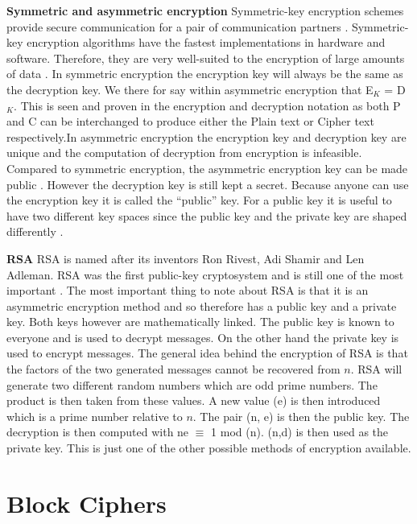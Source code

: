 \documentclass[11pt,a4paper]{report}
\begin{document}
\textbf{Symmetric and asymmetric encryption}
Symmetric-key encryption schemes provide secure communication for a pair of communication partners \cite{DBLP:series/isc/DelfsK07}. Symmetric-key encryption algorithms have the fastest implementations in hardware and software. Therefore, they are very well-suited to the encryption of large amounts of data \cite{DBLP:series/isc/DelfsK07}. In symmetric encryption the encryption key will always be the same as the decryption key. We there for say within asymmetric encryption that E$_{K}$ = D$_{K}$. This is seen and proven in the encryption and decryption notation as both P and C can be interchanged to produce either the Plain text or Cipher text respectively.In asymmetric encryption the encryption key and decryption key are unique and the computation of decryption from encryption is infeasible. Compared to symmetric encryption, the asymmetric encryption key can be made public \cite{DBLP:series/isc/DelfsK07}. However the decryption key is still kept a secret. Because anyone can use the encryption key it is called the “public” key. For a public key it is useful to have two different key spaces since the public key and the private key are shaped differently \cite{DBLP:series/isc/DelfsK07}.

\textbf{RSA}
RSA is named after its inventors Ron Rivest, Adi Shamir and Len Adleman. RSA was the first public-key cryptosystem and is still one of the most important \cite{DBLP:series/isc/DelfsK07}. The most important thing to note about RSA is that it is an asymmetric encryption method and so therefore has a public key and a private key. Both keys however are mathematically linked. The public key is known to everyone and is used to decrypt messages. On the other hand the private key is used to encrypt messages. The general idea behind the encryption of RSA is that the factors of the two generated messages cannot be recovered from $n$. RSA will generate two different random numbers which are odd prime numbers. The product is then taken from these values. A new value (e) is then introduced which is a prime number relative to $n$. The pair (n, e) is then the public key. The decryption is then computed with ne $\equiv$ 1 mod (n). (n,d) is then used as the private key. This is just one of the other possible methods of encryption available.

\section{Block Ciphers}
\label{cha:BCipher}
\end{document}
